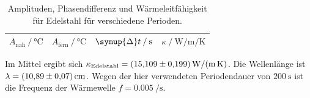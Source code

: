 \begin{table}[H]
     \centering
     \caption{Amplituden, Phasendifferenz und Wärmeleitfähigkeit für Edelstahl für verschiedene Perioden.}
     \label{tab:edelstahl}
     \begin{tabular}{c c c c}
      \toprule
      $A_\text{nah} \mathbin{/} \si{\celsius}$ &
      $A_\text{fern} \mathbin{/} \si{\celsius}$ &
      $\symup{\Delta}t \mathbin{/} \si{\second}$ &
      $\kappa \mathbin{/} \si{\watt\per\meter\per\kelvin}$ \\
      \midrule
      
      \bottomrule
     \end{tabular}
\end{table}

Im Mittel ergibt sich $\kappa_\text{Edelstahl} = \SI{15.109 \pm 0.199}{\watt\per\meter\per\kelvin}$.
Die Wellenlänge ist $\lambda = \SI{10.89 \pm 0.07}{\centi\meter}$.
Wegen der hier verwendeten Periodendauer von $\SI{200}{\second}$ ist die Frequenz der Wärmewelle $f = \SI{0.005}{\per\second}$.
